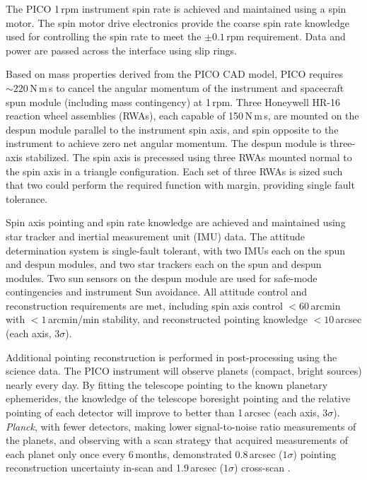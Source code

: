 The PICO 1\,rpm instrument spin rate is achieved and maintained using
a spin motor. The spin motor drive electronics provide the coarse spin
rate knowledge used for controlling the spin rate to meet the
$\pm0.1$\,rpm requirement. Data and power are passed across the
interface using slip rings.

Based on mass properties derived from the PICO CAD model, PICO
requires $\sim220$\,N\,m\,s to cancel the angular momentum of the
instrument and spacecraft spun module (including mass contingency) at
1\,rpm. Three Honeywell HR-16 reaction wheel assemblies (RWAs), each
capable of 150\,N\,m\,s, are mounted on the despun module parallel to
the instrument spin axis, and spin opposite to the instrument to
achieve zero net angular momentum. The despun module is three-axis
stabilized. The spin axis is precessed using three RWAs mounted normal
to the spin axis in a triangle configuration. Each set of three RWAs
is sized such that two could perform the required function with
margin, providing single fault tolerance.

Spin axis pointing and spin rate knowledge are achieved and maintained
using star tracker and inertial measurement unit (IMU) data. The
attitude determination system is single-fault tolerant, with two IMUs
each on the spun and despun modules, and two star trackers each on the
spun and despun modules. Two sun sensors on the despun module are used
for safe-mode contingencies and instrument Sun avoidance. All attitude
control and reconstruction requirements are met, including spin axis
control $< 60$\,arcmin with $< 1$\,arcmin/min stability, and
reconstructed pointing knowledge $< 10$\,arcsec (each axis, $3\sigma$).

Additional pointing reconstruction is performed in post-processing
using the science data.  The PICO instrument will observe planets
(compact, bright sources) nearly every day.  By fitting the telescope
pointing to the known planetary ephemerides, the knowledge of the
telescope boresight pointing and the relative pointing of each
detector will improve to better than 1\,arcsec (each axis, $3\sigma$). \textit{Planck},
with fewer detectors, making lower signal-to-noise ratio measurements
of the planets, and observing with a scan strategy that acquired
measurements of each planet only once every 6\,months, demonstrated 0.8\,arcsec ($1\sigma$) pointing reconstruction uncertainty in-scan and 1.9\,arcsec ($1\sigma$) cross-scan \citep{2016A&A...594A...1P}.

